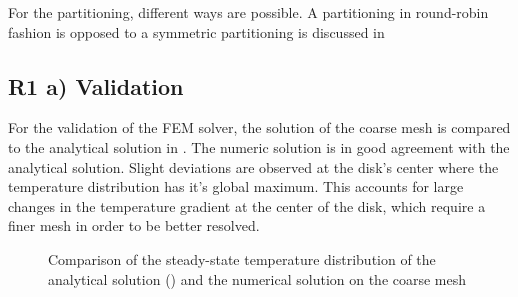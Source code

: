 For the partitioning, different ways are possible. A partitioning in round-robin fashion is opposed to a symmetric partitioning is discussed in 

\subsection{R1 a) Validation}
For the validation of the FEM solver, the solution of the coarse mesh is compared to the analytical solution  in . The numeric solution is in good agreement with the analytical solution. Slight deviations are observed at the disk's center where the temperature distribution has it's global maximum. This accounts for large changes in the temperature gradient at the center of the disk, which require a finer mesh in order to be better resolved. 

\begin{figure}[!htbp]
	\centering
	\leavevmode
	\resizebox{0.8\width}{!}{}
	\caption{Comparison of the steady-state temperature distribution of the analytical solution () and the numerical solution on the coarse mesh}
	\label{fig::TemperatureDist}
\end{figure}
